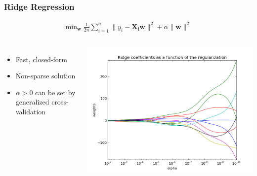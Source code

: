 \begin{frame}
\frametitle{Ridge Regression}

\begin{align*}
\text{min}_{\mathbf{w}} \; \frac{1}{2n} \sum_{i=1}^n \|y_i - \mathbf{X_i}\mathbf{w}\|^2 + \alpha \|\mathbf{w}\|^2
\end{align*}


\begin{columns}
\begin{itemize}
\item Fast, closed-form
\item Non-sparse solution
\item $\alpha > 0$ can be set by generalized cross-validation
\end{itemize}
\includegraphics[width=\textwidth]{sklearn_material/plot_ridge_path_0011.png}

\end{columns}
\end{frame}


